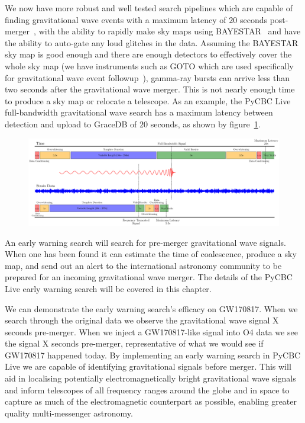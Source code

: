 We now have more robust and well tested search pipelines which are capable of finding gravitational wave events with a maximum latency of $20$ seconds post-merger~\cite{PyCBC_Live:2018}, with the ability to rapidly make sky maps using BAYESTAR~\cite{BAYESTAR:2016} and have the ability to auto-gate any loud glitches in the data. Assuming the BAYESTAR sky map is good enough and there are enough detectors to effectively cover the whole sky map (we have instruments such as GOTO which are used specifically for gravitational wave event followup~\cite{GOTO:2020}), gamma-ray bursts can arrive less than two seconds after the gravitational wave merger. This is not nearly enough time to produce a sky map or relocate a telescope. As an example, the PyCBC Live full-bandwidth gravitational wave search has a maximum latency between detection and upload to GraceDB of $20$ seconds, as shown by figure~\ref{6:fig:latency_plot}.
%
\begin{figure}
    \centering
    \includegraphics[width=\textwidth]{images/6_earlywarning/gw170817/latency_plot.pdf}
    \caption{}
    \label{6:fig:latency_plot}
\end{figure}
%
An early warning search will search for pre-merger gravitational wave signals. When one has been found it can estimate the time of coalescence, produce a sky map, and send out an alert to the international astronomy community to be prepared for an incoming gravitational wave merger. The details of the PyCBC Live early warning search will be covered in this chapter.

We can demonstrate the early warning search's efficacy on GW170817. When we search through the original data we observe the gravitational wave signal X seconds pre-merger. When we inject a GW170817-like signal into O4 data we see the signal X seconds pre-merger, representative of what we would see if GW170817 happened today. By implementing an early warning search in PyCBC Live we are capable of identifying gravitational signals before merger. This will aid in localising potentially electromagnetically bright gravitational wave signals and inform telescopes of all frequency ranges around the globe and in space to capture as much of the electromagnetic counterpart as possible, enabling greater quality multi-messenger astronomy.

